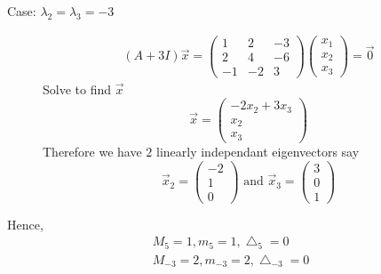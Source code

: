 \documentclass{article}
\numberwithin{equation}{section}
\begin{document}
\begin{eg}
\begin{enumerate}
\begin{description}
            \item[Case: $\lambda_2 = \lambda_3 = -3$]
            \begin{align*}
                (A + 3I)\vec x = \begin{pmatrix}
                    1 & 2 & -3 \\
                    2 & 4 & -6 \\
                    -1 & -2 & 3
                \end{pmatrix}
                \begin{pmatrix}
                    x_1 \\ x_2 \\ x_3
                \end{pmatrix} 
                = \vec 0
            \end{align*}
            Solve to find $\vec x$
            \[
                \vec x = \begin{pmatrix}
                    -2x_2 + 3x_3 \\
                    x_2 \\
                    x_3
                \end{pmatrix}  
            \]
            Therefore we have $2$ linearly independant eigenvectors say
            \[
                \vec x_2 = \begin{pmatrix}
                    -2 \\ 1 \\ 0
                \end{pmatrix}
                \text{ and }
                \vec x_3 = \begin{pmatrix}
                    3 \\ 0 \\ 1
                \end{pmatrix} 
            \]
        \end{description}
        Hence,
        \begin{align*}
            M_5 = 1, m_5 = 1, \bigtriangleup_{5} = 0 \\
            M_{-3} = 2, m_{-3} = 2, \bigtriangleup_{-3} = 0
        \end{align*}


\end{enumerate}
\end{eg}
\end{document}
